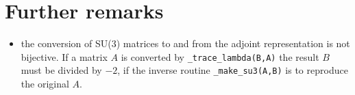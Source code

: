 \section{Further remarks}
\begin{itemize}
\item{}the conversion of SU(3) matrices to and from the adjoint representation is not bijective. If a matrix $A$ is converted by \texttt{\_trace\_lambda(B,A)} the result $B$ must be divided by $-2$, if the inverse routine \texttt{\_make\_su3(A,B)} is to reproduce the original $A$.  
\end{itemize}
